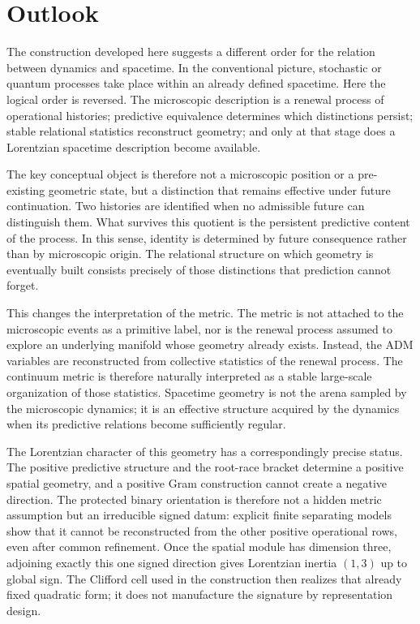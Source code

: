 \documentclass[11pt]{article}
\theoremstyle{definition}
\theoremstyle{remark}
\begin{document}
\section{Outlook}
\label{sec:discussion}

The construction developed here suggests a different order for the relation
between dynamics and spacetime.  In the conventional picture, stochastic or
quantum processes take place within an already defined spacetime.  Here the
logical order is reversed.  The microscopic description is a renewal process
of operational histories; predictive equivalence determines which distinctions
persist; stable relational statistics reconstruct geometry; and only at that
stage does a Lorentzian spacetime description become available.

The key conceptual object is therefore not a microscopic position or a
pre-existing geometric state, but a distinction that remains effective under
future continuation.  Two histories are identified when no admissible future
can distinguish them.  What survives this quotient is the persistent predictive
content of the process.  In this sense, identity is determined by future
consequence rather than by microscopic origin.  The relational structure on
which geometry is eventually built consists precisely of those distinctions
that prediction cannot forget.

This changes the interpretation of the metric.  The metric is not attached to
the microscopic events as a primitive label, nor is the renewal process assumed
to explore an underlying manifold whose geometry already exists.  Instead,
the ADM variables are reconstructed from collective statistics of the renewal
process.  The continuum metric is therefore naturally interpreted as a stable
large-scale organization of those statistics.  Spacetime geometry is not the
arena sampled by the microscopic dynamics; it is an effective structure
acquired by the dynamics when its predictive relations become sufficiently
regular.

The Lorentzian character of this geometry has a correspondingly precise
status.  The positive predictive structure and the root-race bracket determine
a positive spatial geometry, and a positive Gram construction cannot create a
negative direction.  The protected binary orientation is therefore not a
hidden metric assumption but an irreducible signed datum: explicit finite
separating models show that it cannot be reconstructed from the other positive
operational rows, even after common refinement.  Once the spatial module has
dimension three, adjoining exactly this one signed direction gives Lorentzian
inertia $(1,3)$ up to global sign.  The Clifford cell used in the construction
then realizes that already fixed quadratic form; it does not manufacture the
signature by representation design.
\end{document}
